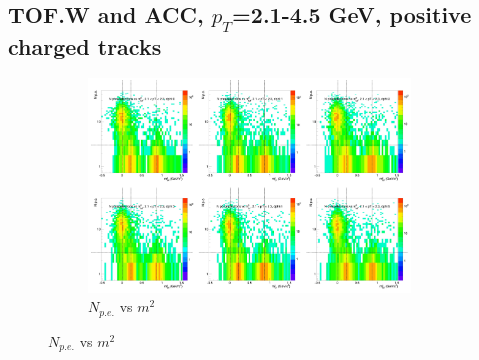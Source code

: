 \subsection{TOF.W and ACC, $p_T$=2.1-4.5 GeV, positive charged tracks}

\begin{figure}[H]
  \centering
    \begin{subfigure}{1\textwidth}
   \centering
   \includegraphics[width=0.94\textwidth]{hiptfits/pos/PSaccthreshold_cent0_ich1_accfire0_ptbin8.jpg}
    \caption{$N_{p.e.}$ vs $m^2$}
    \end{subfigure}
\end{figure}
